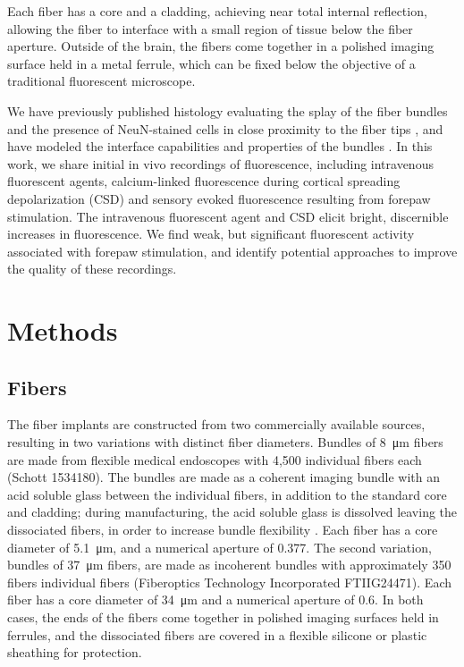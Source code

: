 Each fiber has a core and a cladding, achieving near total internal 
reflection, allowing the fiber to interface with a small region of 
tissue below the fiber aperture. Outside of the brain, the fibers come
 together in a polished imaging surface held in a metal ferrule, which
 can be fixed below the objective of a traditional fluorescent 
microscope.



We have previously published histology evaluating the splay of the 
fiber bundles and the presence of NeuN-stained cells in close 
proximity to the fiber tips \cite{Perkins:2018ae}, and have modeled 
the interface capabilities and properties of the bundles \cite{xxx}. 
In this work, we share initial in vivo recordings of fluorescence, 
including intravenous fluorescent agents, calcium-linked fluorescence 
during cortical spreading depolarization (CSD) and sensory evoked 
fluorescence resulting from forepaw stimulation. The intravenous 
fluorescent agent and CSD elicit bright, discernible increases in 
fluorescence. We find weak, but significant fluorescent activity 
associated with forepaw stimulation, and identify potential approaches
 to improve the quality of these recordings.

\section{Methods}

\subsection{Fibers}

The fiber implants are constructed from two commercially available 
sources, resulting in two variations with distinct fiber diameters. 
Bundles of 8~\si{\micro\meter} fibers are made from flexible medical 
endoscopes with 4,500 individual fibers each (Schott 1534180). The 
bundles are made as a coherent imaging bundle with an acid soluble 
glass between the individual fibers, in addition to the standard core 
and cladding; during manufacturing, the acid soluble glass is 
dissolved leaving the dissociated fibers, in order to increase bundle 
flexibility \cite{Gerstner:2004to}. Each fiber has a core diameter of 
5.1~\si{\micro\meter}, and a numerical aperture of 0.377. The second 
variation, bundles of 37~\si{\micro\meter} fibers, are made as 
incoherent bundles with approximately 350 fibers individual fibers 
(Fiberoptics Technology Incorporated FTIIG24471). Each fiber has a 
core diameter of 34~\si{\micro\meter} and a numerical aperture of 0.6.
 In both cases, the ends of the fibers come together in polished 
imaging surfaces held in ferrules, and the dissociated fibers are 
covered in a flexible silicone or plastic sheathing for protection.



